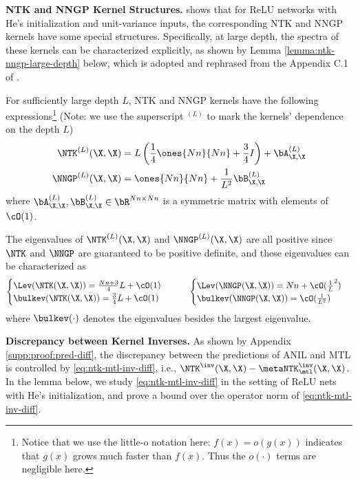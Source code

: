 \documentclass{article}
\begin{document}
\textbf{NTK and NNGP Kernel Structures.} \citet{xiao2020dis} shows that for ReLU networks with He's initialization and unit-variance inputs, the corresponding NTK and NNGP kernels have some special structures. Specifically, at large depth, the spectra of these kernels can be characterized explicitly, as shown by Lemma \ref{lemma:ntk-nngp-large-depth} below, which is adopted and rephrased from the Appendix C.1 of \citet{xiao2020dis}.
\begin{lemma}\label{lemma:ntk-nngp-large-depth} For sufficiently large depth $L$, NTK and NNGP kernels have the following expressions\footnote{Notice that we use the little-o notation here: $f(x) = o(g(x))$ indicates that $g(x)$ grows much faster than $f(x)$. Thus the $o(\cdot)$ terms are negligible here.} (Note: we use the superscript $^{(L)}$ to mark the kernels' dependence on the depth $L$)
    \begin{align}
        \NTK^{(L)}(\X,\X) &= L\left(\frac{1}{4} \ones{Nn}{Nn} + \frac{3}{4} I \right)+ \bA^{(L)}_{\X,\X} \label{eq:large-depth:ntk}\\
        \NNGP^{(L)}(\X,\X) &= \ones{Nn}{Nn} + \frac{1}{L^2} \bB^{(L)}_{\X,\X}\label{eq:large-depth:nngp}
\end{align}
where $\bA^{(L)}_{\X,\X}, \bB^{(L)}_{\X,\X} \in \bR^{Nn \times Nn}$ is a symmetric matrix with elements of $\cO(1)$.

The eigenvalues of $\NTK^{(L)}(\X,\X)$ and $\NNGP^{(L)}(\X,\X)$ are all positive since $\NTK$ and $\NNGP$ are guaranteed to be positive definite, and these eigenvalues can be characterized as
\begin{align}
    \begin{cases}
    \Lev(\NTK(\X,\X)) = \frac{Nn+3}{4} L + \cO(1) \\
    \bulkev(\NTK(\X,\X)) = \frac{3}{4} L + \cO(1) 
    \end{cases}
    \qquad 
    \begin{cases}
        \Lev(\NNGP(\X,\X)) = Nn + \cO(\frac 1 L^2) \\
        \bulkev(\NNGP(\X,\X)) = \cO(\frac{1}{L^2}) 
        \end{cases}
\end{align}
where $\bulkev(\cdot)$ denotes the eigenvalues besides the largest eigenvalue.
\end{lemma}

\textbf{Discrepancy between Kernel Inverses.} As shown by Appendix \ref{supp:proof:pred-diff}, the discrepancy between the predictions of ANIL and MTL is controlled by \eqref{eq:ntk-mtl-inv-diff}, i.e., $\NTK^\inv(\X,\X) - \metaNTK_\mtl^\inv(\X,\X)$. In the lemma below, we study \eqref{eq:ntk-mtl-inv-diff} in the setting of ReLU nets with He's initialization, and prove a bound over the operator norm of \eqref{eq:ntk-mtl-inv-diff}.
\end{document}
